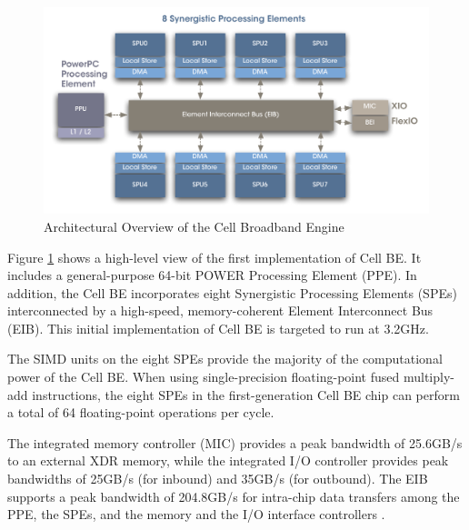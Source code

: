 \documentclass[DIV10, abstracton, openright, footsepline, headsepline, twoside, 9pt,
bigheadings]{scrreprt}
\begin{document}
\begin{figure}[H]
\centering
\includegraphics[width=\textwidth]{diagramme/cbe}
\caption{Architectural Overview of the Cell Broadband Engine}
\label{fig:cbe}
\end{figure}


Figure \ref{fig:cbe} shows a high-level view of the first implementation of Cell
BE. It includes a general-purpose 64-bit POWER Processing Element (PPE). In
addition, the Cell BE incorporates eight Synergistic Processing Elements (SPEs)
interconnected by a high-speed, memory-coherent Element Interconnect Bus (EIB).
This initial implementation of Cell BE is targeted to run at 3.2GHz.

The SIMD units on the eight SPEs provide the majority of the computational power
of the Cell BE. When using single-precision floating-point fused multiply-add
instructions, the eight SPEs in the first-generation Cell BE chip can perform a
total of 64 floating-point operations per cycle.

The integrated memory controller (MIC) provides a peak bandwidth of 25.6GB/s to
an external XDR memory, while the integrated I/O controller provides peak
bandwidths of 25GB/s (for inbound) and 35GB/s (for outbound). The EIB supports a
peak bandwidth of 204.8GB/s for intra-chip data transfers among the PPE, the
SPEs, and the memory and the I/O interface controllers \cite{IBMhp05}.
\end{document}
